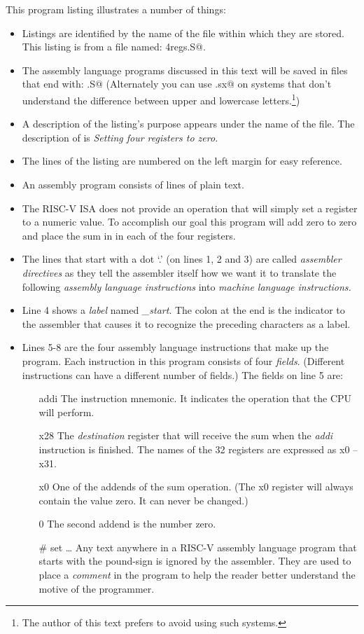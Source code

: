 This program listing illustrates a number of things:
\begin{itemize}
\item Listings are identified by the name of the file within which
	they are stored.  This listing is from a file named: \verb@zero4regs.S@.
\item The assembly language programs discussed in this text will be saved
	in files that end with: \verb@.S@  (Alternately you can use \verb@.sx@
	on systems that don't understand the difference between upper and
	lowercase letters.\footnote{The author of this text prefers to avoid
	using such systems.})
\item A description of the listing's purpose appears under the name of the
	file.  The description of  is
	{\em Setting four registers to zero.}
\item The lines of the listing are numbered on the left margin for
	easy reference.
\item An assembly program consists of lines of plain text.
\item The RISC-V ISA does not provide an operation that will simply
	set a register to a numeric value.  To accomplish our goal this
	program will add zero to zero and place the sum in in each of the
	four registers.
\item The lines that start with a dot `.' (on lines 1, 2 and 3) are
	called {\em assembler directives} as they tell the assembler itself
	how we want it to translate the following {\em assembly language instructions}
	into {\em machine language instructions.}
\item Line 4 shows a {\em label} named {\em \_start}.  The colon
	at the end is the indicator to the assembler that causes it to
	recognize the preceding characters as a label.
\item Lines 5-8 are the four assembly language instructions that
	make up the program.  Each instruction in this program
	consists of four {\em fields}.  (Different instructions can have
	a different number of fields.)  The fields on line 5 are:

	\begin{itemize}
	\item [addi] The instruction mnemonic.  It indicates the operation
		that the CPU will perform.
	\item [x28] The {\em destination} register that will receive the
		sum when the {\em addi} instruction is finished.  The names of
		the 32 registers are expressed as x0 -- x31.
	\item [x0] One of the addends of the sum operation.  (The x0 register
		will always contain the value zero.  It can never be changed.)
	\item [0] The second addend is the number zero.
		\item [\# set \ldots] Any text anywhere in a RISC-V assembly language
	program that starts with the pound-sign is ignored by the assembler.
			They are used to place a {\em comment} in the program to help
	the reader better understand the motive of the programmer.
	\end{itemize}
\end{itemize}

